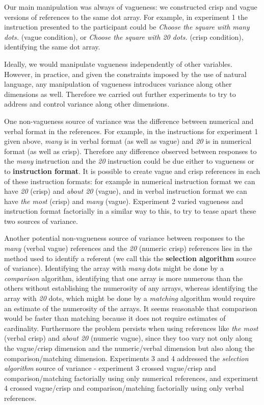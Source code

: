 \documentclass[
a4paper 
, doc
, longtable
]{apa6}
\begin{document}
Our main manipulation was always of vagueness: we constructed crisp and vague versions of references to the same dot array. For example, in experiment 1 the instruction presented to the participant could be \emph{Choose the square with many dots.} (vague condition), or \emph{Choose the square with 20 dots.} (crisp condition), identifying the same dot array.

Ideally, we would manipulate vagueness independently of other variables. However, in practice, and given the constraints imposed by the use of natural language, any manipulation of vagueness introduces variance along other dimensions as well. Therefore we carried out further experiments to try to address and control variance along other dimensions. 

One non-vagueness source of variance was the difference between numerical and verbal format in the references. For example, in the instructions for experiment 1 given above, \emph{many} is in verbal format (as well as vague) and \emph{20} is in numerical format (as well as crisp). Therefore any difference observed between responses to the \emph{many} instruction and the \emph{20} instruction could be due either to vagueness or to {\bf instruction format}. It is possible to create vague and crisp references in each of these instruction formats: for example in numerical instruction format we can have \emph{20} (crisp) and \emph{about 20} (vague), and in verbal instruction format we can have \emph{the most} (crisp) and \emph{many} (vague). Experiment 2 varied vagueness and instruction format factorially in a similar way to this, to try to tease apart these two sources of variance.

Another potential non-vagueness source of variance between responses to the \emph{many} (verbal vague) references and the \emph{20} (numeric crisp) references lies in the method used to identify a referent (we call this the {\bf selection algorithm} source of variance). Identifying the array with \emph{many} dots might be done by a \emph{comparison} algorithm, identifying that one array is more numerous than the others without establishing the numerosity of any arrays, whereas identifying the array with \emph{20} dots, which might be done by a \emph{matching} algorithm would require an estimate of the numerosity of the arrays. It seems reasonable that comparison would be faster than matching because it does not require estimates of cardinality. Furthermore the problem persists when using references like \emph{the most} (verbal crisp) and \emph{about 20} (numeric vague), since they too vary not only along the vague/crisp dimension and the numeric/verbal dimension but also along the comparison/matching dimension. Experiments 3 and 4 addressed the \emph{selection algorithm} source of variance - experiment 3 crossed vague/crisp and comparison/matching factorially using only numerical references, and experiment 4 crossed vague/crisp and comparison/matching factorially using only verbal references.  
\end{document}
